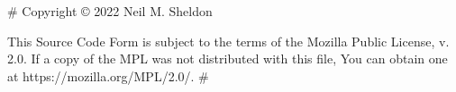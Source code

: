 {#
    Copyright © 2022 Neil M. Sheldon
    
    This Source Code Form is subject to the terms of the Mozilla Public
    License, v. 2.0. If a copy of the MPL was not distributed with this
    file, You can obtain one at https://mozilla.org/MPL/2.0/.
#}{%
\begin{dnd5eStatBlock}
\rpgCreatureHeading{{"{" ~ name ~ "}"}}{{"{" ~ size ~ "}"}}{{"{"}}{{type}}{%

\dndTaperedRule{}

\rpgCreatureStat{Armor Class}{{ "{" ~ armor ~ "}" }}
    
\rpgCreatureStat{Hit Points}{{ "{" ~ hit_points ~ "}" }}
    
\rpgCreatureStat{Speed}{{ "{" ~ speed ~ "}" }}

\dndTaperedRule{}

\begin{dnd5eAbilitiesTable}
{{ strength }} & {{dexterity}} & {{constitution}} & {{intelligence}} & {{wisdom}} & {{charisma}}
\end{dnd5eAbilitiesTable}

\dndTaperedRule{}

{%

{%

{%

{%

{%

{%

{%

{%

\rpgCreatureStat{Challenge}{{ "{" ~  challenge_rating  ~ "}" }}
    
}}}}}}}}}}
\end{dnd5eStatBlock}}
